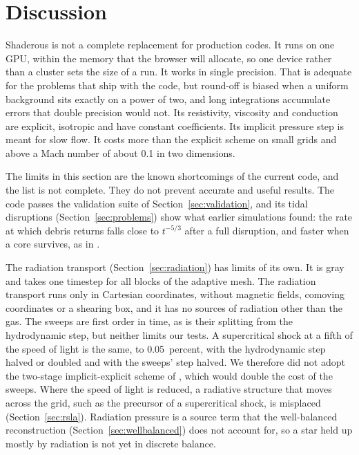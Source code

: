 \documentclass[twocolumn]{aastex701}
\begin{document}
\section{Discussion}
\label{sec:discussion}

Shaderous is not a complete replacement for production codes. It runs on one GPU, within the memory that the browser will allocate, so one device rather than a cluster sets the size of a run. It works in single precision. That is adequate for the problems that ship with the code, but round-off is biased when a uniform background sits exactly on a power of two, and long integrations accumulate errors that double precision would not. Its resistivity, viscosity and conduction are explicit, isotropic and have constant coefficients. Its implicit pressure step is meant for slow flow. It costs more than the explicit scheme on small grids and above a Mach number of about 0.1 in two dimensions.

The limits in this section are the known shortcomings of the current code, and the list is not complete. They do not prevent accurate and useful results. The code passes the validation suite of Section~\ref{sec:validation}, and its tidal disruptions (Section~\ref{sec:problems}) show what earlier simulations found: the rate at which debris returns falls close to $t^{-5/3}$ after a full disruption, and faster when a core survives, as in \citet{Guillochon2013}.

The radiation transport (Section~\ref{sec:radiation}) has limits of its own. It is gray and takes one timestep for all blocks of the adaptive mesh. The radiation transport runs only in Cartesian coordinates, without magnetic fields, comoving coordinates or a shearing box, and it has no sources of radiation other than the gas. The sweeps are first order in time, as is their splitting from the hydrodynamic step, but neither limits our tests. A supercritical shock at a fifth of the speed of light is the same, to 0.05~percent, with the hydrodynamic step halved or doubled and with the sweeps' step halved. We therefore did not adopt the two-stage implicit-explicit scheme of \citet{He2024}, which would double the cost of the sweeps. Where the speed of light is reduced, a radiative structure that moves across the grid, such as the precursor of a supercritical shock, is misplaced (Section~\ref{sec:rsla}). Radiation pressure is a source term that the well-balanced reconstruction (Section~\ref{sec:wellbalanced}) does not account for, so a star held up mostly by radiation is not yet in discrete balance.
\end{document}
